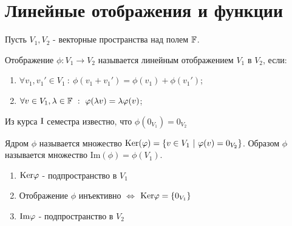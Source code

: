 \section{Линейные отображения и функции}
    Пусть $V_1, V_2$ - векторные пространства над полем $\F$.
    \begin{definition}
        Отображение $\phi: V_1 \rightarrow V_2$ называется линейным отображением $V_1$ в $V_2$, если:
        \begin{enumerate}
            \item $\forall v_1, v_1'\in V_1 \ : \ \phi(v_1 + v_1') = \phi(v_1) + \phi(v_1')$;
            \item $\forall v \in V_1, \lambda \in \F \ : \ \phi(\lambda v) = \lambda\phi(v)$;
        \end{enumerate}
    \end{definition}
        Из курса $\textup{I}$ семестра известно, что $\phi (0_{V_1}) = 0_{V_2}$
    \begin{definition}
        Ядром $\phi$ называется множество $\textup{Ker}(\phi) = \{v \in V_1 \ | \ \phi(v) = 0_{V_2}\}$. Образом $\phi$ называется множество $\text{Im}(\phi) = \phi(V_1)$.
    \end{definition}
    \begin{subtheorem}
    \begin{enumerate} \tab
      \item $\textup{Ker}\phi$ - подпространство в $V_1$
      \item Отображение $\phi$ инъективно $\Longleftrightarrow$ $\textup{Ker}\phi=\{0_{V_1}\}$
      \item $\textup{Im}\phi$ - подпространство в $V_2$
    \end{enumerate}
  \end{subtheorem}
